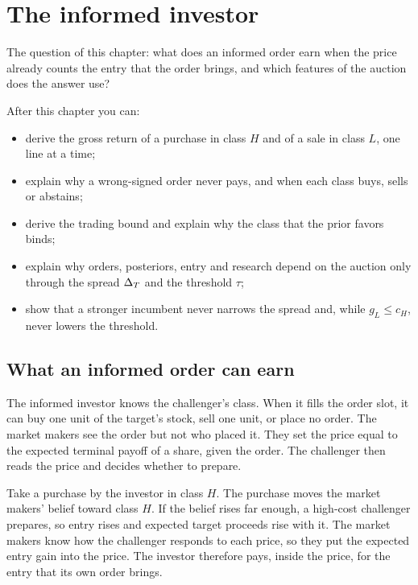\chapter{The informed investor}\label{ch:trading}

\begin{chapterplan}
The question of this chapter: what does an informed order earn when the price already counts the entry that the
order brings, and which features of the auction does the answer use?

After this chapter you can:
\begin{itemize}
\item derive the gross return of a purchase in class \(H\) and of a sale in class \(L\), one line at a time;
\item explain why a wrong-signed order never pays, and when each class buys, sells or abstains;
\item derive the trading bound and explain why the class that the prior favors binds;
\item explain why orders, posteriors, entry and research depend on the auction only through the spread \(\Delta_T\)
and the threshold \(\tau\);
\item show that a stronger incumbent never narrows the spread and, while \(g_L\le c_H\), never lowers the
threshold.
\end{itemize}
\end{chapterplan}

\section{What an informed order can earn}\label{sec:trading-intuition}

The informed investor knows the challenger's class. When it fills the order slot, it can buy one unit of the
target's stock, sell one unit, or place no order. The market makers see the order but not who placed it. They set
the price equal to the expected terminal payoff of a share, given the order. The challenger then reads the price
and decides whether to prepare.

Take a purchase by the investor in class \(H\). The purchase moves the market makers' belief toward class \(H\).
If the belief rises far enough, a high-cost challenger prepares, so entry rises and expected target proceeds rise
with it. The market makers know how the challenger responds to each price, so they put the expected entry gain
into the price. The investor therefore pays, inside the price, for the entry that its own order brings.

